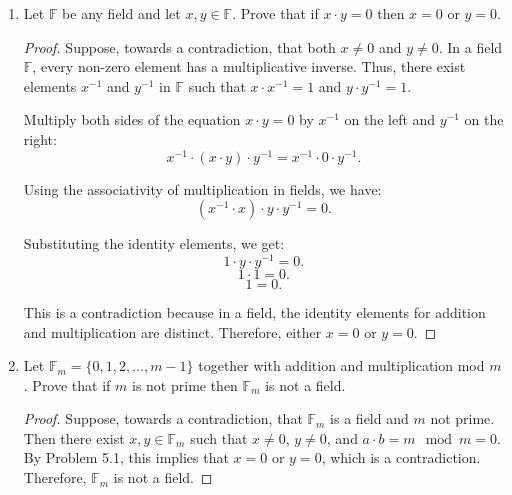 \documentclass[10pt]{article}
\newcommand{\F}{\mathbb{F}}
\newenvironment{problem}[2][Problem]{\begin{trivlist}
\item[\hskip \labelsep {\bfseries #1}\hskip \labelsep {\bfseries #2.}]}{\end{trivlist}}
\begin{document}
\newpage
\begin{problem}{5}\;
	\begin{enumerate}
		\item Let $ \F $ be any field and let $ x,y \in \F $. Prove that if $ x \cdot y=0 $ then $ x=0 $ or $ y=0 $.
            \begin{proof}
                Suppose, towards a contradiction, that both \( x \neq 0 \) and \( y \neq 0 \). In a field \( \mathbb{F} \), every non-zero element has a multiplicative inverse. Thus, there exist elements \( x^{-1} \) and \( y^{-1} \) in \( \mathbb{F} \) such that \( x \cdot x^{-1} = 1 \) and \( y \cdot y^{-1} = 1 \).

                Multiply both sides of the equation \( x \cdot y = 0 \) by \( x^{-1} \) on the left and \( y^{-1} \) on the right:
                \[ x^{-1} \cdot (x \cdot y) \cdot y^{-1} = x^{-1} \cdot 0 \cdot y^{-1}. \]

                Using the associativity of multiplication in fields, we have:
                \[ (x^{-1} \cdot x) \cdot y \cdot y^{-1} = 0. \]

                Substituting the identity elements, we get:
                \[ 1 \cdot y \cdot y^{-1} = 0. \]
                \[ 1 \cdot 1 = 0. \]
                \[ 1 = 0. \]

                This is a contradiction because in a field, the identity elements for addition and multiplication are distinct. Therefore, either \( x = 0 \) or \( y = 0 \).
            \end{proof}

 		\item Let $ \F_m=\{0,1,2,...,m-1 \} $ together with addition and multiplication mod $ m $. Prove that if $ m $ is not prime then $ \F_m $ is not a field.
            \begin{proof}
                Suppose, towards a contradiction, that \( \F_m \) is a field and $m$ not prime. Then there exist $x, y \in \F_m$ such that $x \neq 0$, $y \neq 0$, and $a \cdot b = m \mod m = 0$.
                By Problem 5.1, this implies that $ x=0 $ or $y=0$, which is a contradiction. Therefore, $ \F_m $ is not a field.
            \end{proof}
	\end{enumerate}
\end{problem}
\medskip

\newpage
\end{document}
